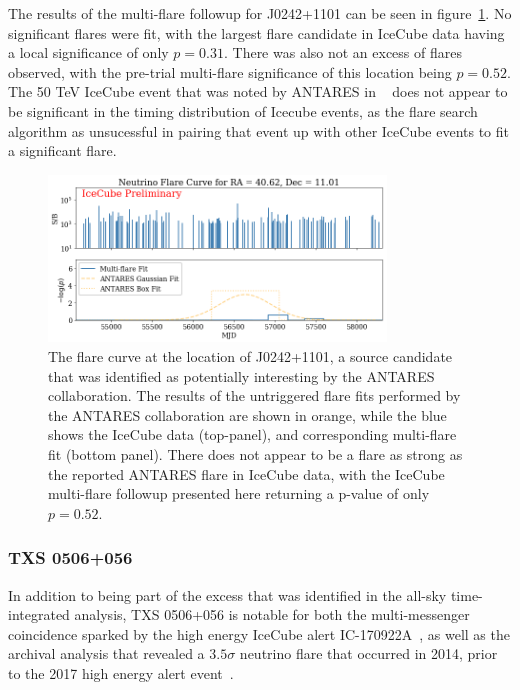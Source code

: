 The results of the multi-flare followup for J0242+1101 can be seen in figure~\ref{fig:J0242}. No significant flares were fit, with the largest flare candidate in IceCube data having a local significance of only $p=0.31$. There was also not an excess of flares observed, with the pre-trial multi-flare significance of this location being $p=0.52$. The 50 TeV IceCube event that was noted by ANTARES in ~\cite{Illuminati:202198} does not appear to be significant in the timing distribution of Icecube events, as the flare search algorithm as unsucessful in pairing that event up with other IceCube events to fit a significant flare. 

\begin{figure}[h]
\centering
\includegraphics[width=0.8\textwidth]{figs/J0242+1101.png}
\caption{The flare curve at the location of J0242+1101, a source candidate that was identified as potentially interesting by the ANTARES collaboration. The results of the untriggered flare fits performed by the ANTARES collaboration are shown in orange, while the blue shows the IceCube data (top-panel), and corresponding multi-flare fit (bottom panel). There does not appear to be a flare as strong as the reported ANTARES flare in IceCube data, with the IceCube multi-flare followup presented here returning a p-value of only $p=0.52$.}
\label{fig:J0242}
\end{figure}


\subsubsection{TXS 0506+056}
In addition to being part of the excess that was identified in the all-sky time-integrated analysis, TXS 0506+056 is notable for both the multi-messenger coincidence sparked by the high energy IceCube alert IC-170922A~\cite{TXS_Multimessenger}, as well as the archival analysis that revealed a $3.5 \sigma$ neutrino flare that occurred in 2014, prior to the 2017 high energy alert event~\cite{TXS_Archival}.

